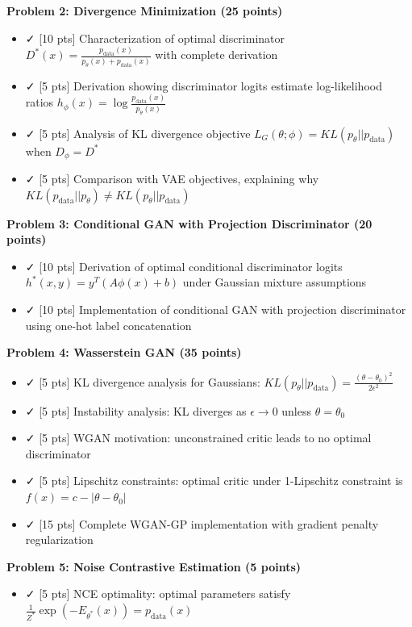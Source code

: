 \documentclass{article}
\begin{document}
\textbf{Problem 2: Divergence Minimization (25 points)}
\begin{itemize}
  \item ✓ [10 pts] Characterization of optimal discriminator $D^*(x) = \frac{p_{\text{data}}(x)}{p_\theta(x) + p_{\text{data}}(x)}$ with complete derivation
  \item ✓ [5 pts] Derivation showing discriminator logits estimate log-likelihood ratios $h_\phi(x) = \log \frac{p_{\text{data}}(x)}{p_\theta(x)}$
  \item ✓ [5 pts] Analysis of KL divergence objective $L_G(\theta; \phi) = KL(p_\theta||p_{\text{data}})$ when $D_\phi = D^*$
  \item ✓ [5 pts] Comparison with VAE objectives, explaining why $KL(p_{\text{data}}||p_\theta) \neq KL(p_\theta||p_{\text{data}})$
\end{itemize}

\textbf{Problem 3: Conditional GAN with Projection Discriminator (20 points)}
\begin{itemize}
  \item ✓ [10 pts] Derivation of optimal conditional discriminator logits $h^*(x,y) = y^T (A\phi(x) + b)$ under Gaussian mixture assumptions
  \item ✓ [10 pts] Implementation of conditional GAN with projection discriminator using one-hot label concatenation
\end{itemize}

\textbf{Problem 4: Wasserstein GAN (35 points)}
\begin{itemize}
  \item ✓ [5 pts] KL divergence analysis for Gaussians: $KL(p_\theta||p_{\text{data}}) = \frac{(\theta - \theta_0)^2}{2\epsilon^2}$
  \item ✓ [5 pts] Instability analysis: KL diverges as $\epsilon \to 0$ unless $\theta = \theta_0$
  \item ✓ [5 pts] WGAN motivation: unconstrained critic leads to no optimal discriminator
  \item ✓ [5 pts] Lipschitz constraints: optimal critic under 1-Lipschitz constraint is $f(x) = c - |\theta - \theta_0|$
  \item ✓ [15 pts] Complete WGAN-GP implementation with gradient penalty regularization
\end{itemize}

\textbf{Problem 5: Noise Contrastive Estimation (5 points)}
\begin{itemize}
  \item ✓ [5 pts] NCE optimality: optimal parameters satisfy $\frac{1}{Z^*} \exp(-E_{\theta^*}(x)) = p_{\text{data}}(x)$
\end{itemize}
\end{document}
